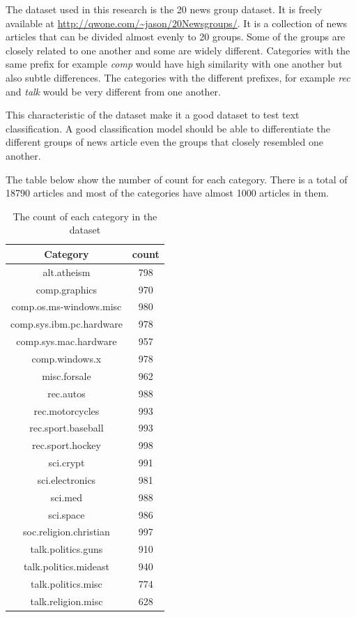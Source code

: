 The dataset used in this research is the 20 news group dataset. It is freely available at \url{http://qwone.com/~jason/20Newsgroups/}. It is a collection of news articles that can be divided almost evenly to 20 groups. Some of the groups are closely related to one another and some are widely different. Categories with the same prefix for example \textit{comp} would have high similarity with one another but also subtle differences. The categories with the different prefixes, for example \textit{rec} and \textit{talk} would be very different from one another.

This characteristic of the dataset make it a good dataset to test text classification. A good classification model should be able to differentiate the different groups of news article even the groups that closely resembled one another.

The table below show the number of count for each category. There is a total of 18790 articles and most of the categories have almost 1000 articles in them. 

\begin{table} [ht]
	\centering
	\begin{tabular} {|| c | c ||}
		\hline
		Category & count \\ [0.5ex]
		\hline\hline
		alt.atheism & 798 \\
		comp.graphics & 970 \\
		comp.os.ms-windows.misc & 980 \\
		comp.sys.ibm.pc.hardware & 978 \\
		comp.sys.mac.hardware & 957 \\
		comp.windows.x & 978 \\
		misc.forsale & 962 \\
		rec.autos & 988 \\
		rec.motorcycles & 993 \\
		rec.sport.baseball & 993 \\
		rec.sport.hockey & 998 \\
		sci.crypt & 991 \\
		sci.electronics & 981 \\
		sci.med & 988 \\
		sci.space & 986 \\
		soc.religion.christian & 997 \\
		talk.politics.guns & 910 \\
		talk.politics.mideast & 940 \\
		talk.politics.misc & 774 \\
		talk.religion.misc & 628 \\
		\hline
	\end{tabular}
	\caption{The count of each category in the dataset}
	\label{tbl:freqCount}
\end{table}


